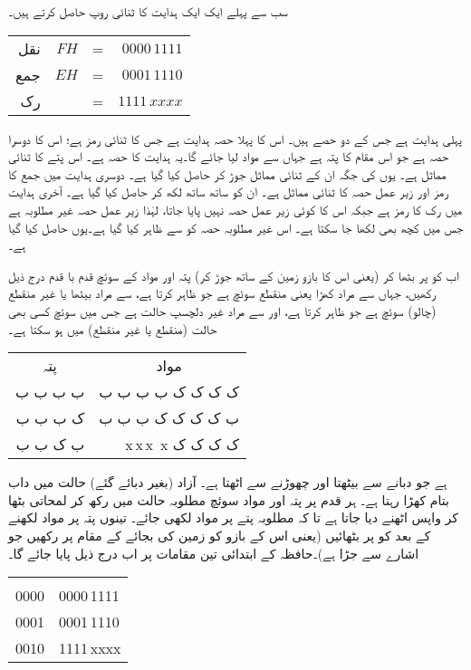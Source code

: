 سب سے پہلے ایک ایک ہدایت کا ثنائی روپ  حاصل کرتے ہیں۔
\begin{center}
\begin{tabular}{rrrr}
نقل&$FH$&=&$0000\,1111$\\
جمع & $EH$&=&$0001\,1110$\\
رک&&=&$1111\,xxxx$
\end{tabular}
\end{center}
پہلی ہدایت   ہے جس   کے دو حصے ہیں۔ اس کا پہلا حصہ  ہدایت  ہے جس کا ثنائی رمز     ہے؛ اس کا دوسرا حصہ    ہے جو     اس مقام کا پتہ ہے جہاں سے مواد لیا جائے گا۔یہ ہدایت کا   حصہ ہے۔ اس پتے کا ثنائی مماثل  ہے۔   یوں  کی جگہ  ان کے ثنائی مماثل جوڑ کر  حاصل کیا گیا ہے۔ دوسری ہدایت میں جمع کا رمز  اور زیر عمل حصہ  کا ثنائی مماثل  ہے۔ ان کو  ساتھ ساتھ لکھ کر  حاصل کیا گیا ہے۔ آخری ہدایت  میں رک کا رمز  ہے جبکہ اس کا کوئی زیر عمل حصہ نہیں پایا جاتا، لہٰذا زیر عمل حصہ غیر مطلوبہ ہے جس میں کچھ بھی لکھا جا سکتا ہے۔ اس غیر مطلوبہ حصہ کو  سے ظاہر کیا گیا ہے۔یوں  حاصل کیا گیا ہے۔

اب  کو   پر بٹھا کر     (یعنی اس کا بازو  زمین کے ساتھ جوڑ کر) پتہ  اور مواد کے  سوئچ    قدم با قدم   درج ذیل رکھیں، جہاں  سے مراد  کھڑا   یعنی منقطع  سوئچ ہے جو  ظاہر کرتا ہے،   سے مراد بیٹھا یا غیر منقطع (چالو) سوئچ ہے  جو     ظاہر کرتا ہے، اور  سے مراد  غیر دلچسپ حالت ہے  جس میں    سوئچ کسی بھی حالت (منقطع یا غیر منقطع)    میں ہو سکتا ہے۔
\begin{center}
\begin{tabular}{rr}
\multicolumn{1}{c}{پتہ}& \multicolumn{1}{c}{مواد}\\[1ex]
ب ب ب ب & ک ک ک ک   ب ب ب ب\\
ک ب ب ب & ب ک ک ک  ک ب ب ب\\
ب ک ب ب & \,\,\,\,\,
 x\,\quad  x\,\quad  x\, \quad x \quad
  ک ک ک ک
\end{tabular}
\end{center}

 ہے جو    دبانے سے بیٹھتا   اور چھوڑنے سے اٹھتا ہے۔ آزاد   (بغیر دبائے گئے)  حالت میں  داب بتام کھڑا رہتا ہے۔  ہر قدم پر  پتہ اور  مواد سوئچ  مطلوبہ حالت میں رکھ کر    لمحاتی بٹھا کر  واپس اٹھنے دیا جاتا ہے تا کہ مطلوبہ پتے پر مواد لکھی جائے۔ تینوں پتہ پر مواد لکھنے کے بعد  کو     پر بٹھائیں (یعنی  اس کے بازو کو  زمین کی بجائے  کے مقام پر رکھیں جو  اشارے سے جڑا ہے)۔حافظہ کے ابتدائی تین  مقامات پر اب درج ذیل پایا جائے گا۔
\begin{center}
\begin{tabular}{LL}
& \\[1ex]
0000&0000\,1111\\
0001&0001\,1110\\
0010&1111\,xxxx
\end{tabular}
\end{center}

